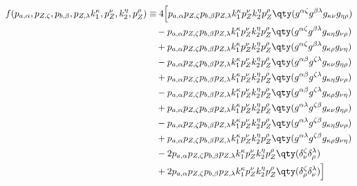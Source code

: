 \begin{align}
	\begin{split}
		f(p_{a,\alpha},p_{Z,\zeta},p_{b,\beta},p_{Z,\lambda}
		k_1^{\kappa},p_Z^{\nu},k_2^{\eta},p_Z^{\rho})&\equiv 4
		\Big[
			p_{a,\alpha}p_{Z,\zeta}p_{b,\beta}p_{Z,\lambda}
			k_1^{\kappa}p_Z^{\nu}k_2^{\eta}p_Z^{\rho}
			\qty(g^{\alpha\zeta}g^{\beta\lambda}g_{\kappa\nu}g_{\eta\rho})
			\\&\quad
			-p_{a,\alpha}p_{Z,\zeta}p_{b,\beta}p_{Z,\lambda}
			k_1^{\kappa}p_Z^{\nu}k_2^{\eta}p_Z^{\rho}
			\qty(g^{\alpha\zeta}g^{\beta\lambda}g_{\kappa\eta}g_{\nu\rho})
			\\&\quad
			+p_{a,\alpha}p_{Z,\zeta}p_{b,\beta}p_{Z,\lambda}
			k_1^{\kappa}p_Z^{\nu}k_2^{\eta}p_Z^{\rho}
			\qty(g^{\alpha\zeta}g^{\beta\lambda}g_{\kappa\rho}g_{\nu\eta})
			\\&\quad
			-p_{a,\alpha}p_{Z,\zeta}p_{b,\beta}p_{Z,\lambda}
			k_1^{\kappa}p_Z^{\nu}k_2^{\eta}p_Z^{\rho}
			\qty(g^{\alpha\beta}g^{\zeta\lambda}g_{\kappa\nu}g_{\eta\rho})
			\\&\quad
			+p_{a,\alpha}p_{Z,\zeta}p_{b,\beta}p_{Z,\lambda}
			k_1^{\kappa}p_Z^{\nu}k_2^{\eta}p_Z^{\rho}
			\qty(g^{\alpha\beta}g^{\zeta\lambda}g_{\kappa\eta}g_{\nu\rho})
			\\&\quad
			-p_{a,\alpha}p_{Z,\zeta}p_{b,\beta}p_{Z,\lambda}
			k_1^{\kappa}p_Z^{\nu}k_2^{\eta}p_Z^{\rho}
			\qty(g^{\alpha\beta}g^{\zeta\lambda}g_{\kappa\rho}g_{\nu\eta})
			\\&\quad
			+p_{a,\alpha}p_{Z,\zeta}p_{b,\beta}p_{Z,\lambda}
			k_1^{\kappa}p_Z^{\nu}k_2^{\eta}p_Z^{\rho}
			\qty(g^{\alpha\lambda}g^{\zeta\beta}g_{\kappa\nu}g_{\eta\rho})
			\\&\quad
			-p_{a,\alpha}p_{Z,\zeta}p_{b,\beta}p_{Z,\lambda}
			k_1^{\kappa}p_Z^{\nu}k_2^{\eta}p_Z^{\rho}
			\qty(g^{\alpha\lambda}g^{\zeta\beta}g_{\kappa\eta}g_{\nu\rho})
			\\&\quad
			+p_{a,\alpha}p_{Z,\zeta}p_{b,\beta}p_{Z,\lambda}
			k_1^{\kappa}p_Z^{\nu}k_2^{\eta}p_Z^{\rho}
			\qty(g^{\alpha\lambda}g^{\zeta\beta}g_{\kappa\rho}g_{\nu\eta})
			\\&\quad
			-2p_{a,\alpha}p_{Z,\zeta}p_{b,\beta}p_{Z,\lambda}
			k_1^{\kappa}p_Z^{\nu}k_2^{\eta}p_Z^{\rho}
			\qty(\delta^\zeta_\nu\delta^\lambda_\rho)
			\\&\quad
			+2p_{a,\alpha}p_{Z,\zeta}p_{b,\beta}p_{Z,\lambda}
			k_1^{\kappa}p_Z^{\nu}k_2^{\eta}p_Z^{\rho}
			\qty(\delta^\zeta_\rho\delta^\lambda_\nu)
		\Big]
	\end{split}
\end{align}
